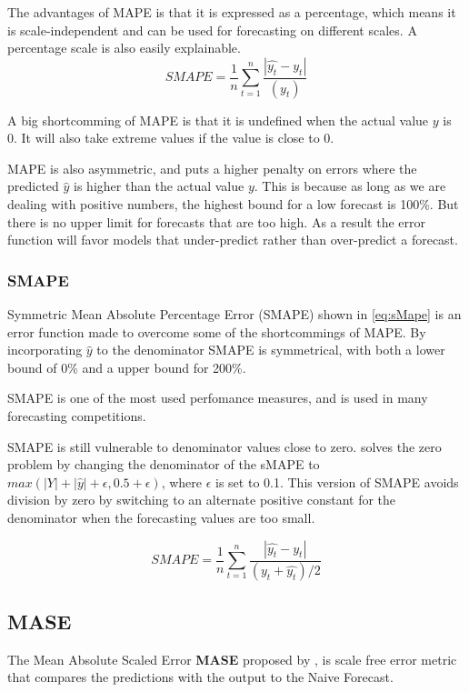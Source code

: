 The advantages of MAPE is that it is expressed as a percentage, which means
it is scale-independent and can be used for forecasting on different scales.
A percentage scale is also easily explainable.
\begin{equation}
  \label{eq:Mape}
  SMAPE = \frac{1}{n} \sum_{t=1}^n \frac{|\hat{y_t} - y_t|}{(y_t)}
\end{equation}

A big shortcomming of MAPE is that it is undefined when the actual value $y$ is 0.
It will also take extreme values if the value is close to 0.

MAPE is also asymmetric, and puts a higher penalty on errors where the predicted
$\hat{y}$ is higher than the actual value $y$.
This is because as long as we are dealing with positive numbers,
the highest bound for a low forecast is 100\%. But there is no upper limit
for forecasts that are too high. As a result the error function will
favor models that under-predict rather than over-predict a forecast.

\subsubsection{SMAPE}
Symmetric Mean Absolute Percentage Error (SMAPE) shown in \autoref{eq:sMape}
is an error function made to overcome some of the shortcommings of MAPE.
By incorporating $\hat{y}$ to the denominator SMAPE is symmetrical,
with both a lower bound of 0\% and a upper bound for 200\%.

SMAPE is one of the most used perfomance measures, and is used in many forecasting competitions.

SMAPE is still vulnerable to denominator values close to zero.
\cite{Hewamalage2021} solves the zero problem by changing the denominator
of the sMAPE to $max(|Y| + |\hat{y}| + \epsilon, 0.5 + \epsilon)$, where $\epsilon$
is set to 0.1.
This version of SMAPE avoids division by zero by switching to an alternate positive
constant for the denominator when the forecasting values are too small.


\begin{equation}
  \label{eq:sMape}
  SMAPE = \frac{1}{n} \sum_{t=1}^n \frac{|\hat{y_t} - y_t|}{(y_t + \hat{y_t}) / 2}
\end{equation}

\subsection{MASE}
The Mean Absolute Scaled Error \textbf{MASE}
proposed by \cite{Hyndman2006}, is scale free
error metric that compares the predictions with
the output to the Naive Forecast.


